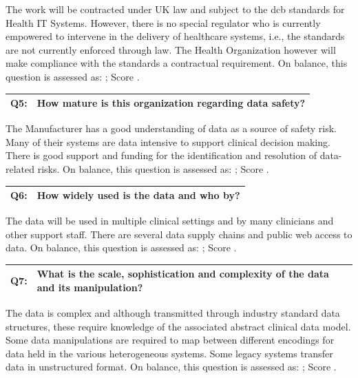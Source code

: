 The work will be contracted under UK law and subject to the
\gls{dcb}
standards for Health IT Systems. However, there is no special regulator who is currently empowered to intervene in the delivery of healthcare systems, i.e., the standards are not currently enforced through law. The Health Organization however will make compliance with the standards a contractual requirement. On balance, this question is assessed as: ; Score .

\begin{longtable*}[H]
  {|L{}|L{}|}
  \hline
  Q5: & How mature is this organization regarding data safety?\\
  \hline
\end{longtable*}

The Manufacturer has a good understanding of data as a source of safety risk. Many of their systems are data intensive to support clinical decision making. There is good support and funding for the identification and resolution of data-related risks. On balance, this question is assessed as: ; Score .

\begin{longtable*}[H]
  {|L{}|L{}|}
  \hline
  Q6: & How widely used is the data and who by?\\
  \hline
\end{longtable*}

The data will be used in multiple clinical settings and by many clinicians and other support staff. There are several data supply chains and public web access to data. On balance, this question is assessed as: ; Score .

\begin{longtable*}[H]
  {|L{}|L{}|}
  \hline
  Q7: & What is the scale, sophistication and complexity of the data and its manipulation?\\
  \hline
\end{longtable*}

The data is complex and although transmitted through industry standard data structures, these require knowledge of the associated abstract clinical data model. Some data manipulations are required to map between different encodings for data held in the various heterogeneous systems. Some legacy systems transfer data in unstructured format. On balance, this question is assessed as: ; Score .


